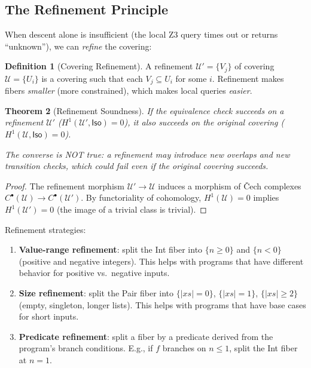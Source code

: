 \documentclass[11pt,a4paper]{report}
\theoremstyle{definition}
\newtheorem{definition}{Definition}[chapter]
\theoremstyle{plain}
\newtheorem{theorem}[definition]{Theorem}
\newcommand{\covers}{\mathcal{U}}
\newcommand{\Iso}{\mathsf{Iso}}
\newcommand{\Hone}{H^1}
\begin{document}
\subsection{The Refinement Principle}

When descent alone is insufficient (the local Z3 query times out or
returns ``unknown''), we can \emph{refine} the covering:

\begin{definition}[Covering Refinement]
A refinement $\covers' = \{V_j\}$ of covering $\covers = \{U_i\}$
is a covering such that each $V_j \subseteq U_i$ for some $i$.
Refinement makes fibers \emph{smaller} (more constrained), which
makes local queries \emph{easier}.
\end{definition}

\begin{theorem}[Refinement Soundness]
\label{thm:refinement}
If the equivalence check succeeds on a refinement $\covers'$
($\Hone(\covers', \Iso) = 0$), it also succeeds on the original
covering ($\Hone(\covers, \Iso) = 0$).

The converse is NOT true: a refinement may introduce new overlaps
and new transition checks, which could fail even if the original
covering succeeds.
\end{theorem}

\begin{proof}
The refinement morphism $\covers' \to \covers$ induces a morphism
of \v{C}ech complexes $C^\bullet(\covers) \to C^\bullet(\covers')$.
By functoriality of cohomology, $\Hone(\covers) = 0$ implies
$\Hone(\covers') = 0$ (the image of a trivial class is trivial).
\end{proof}

Refinement strategies:
\begin{enumerate}
  \item \textbf{Value-range refinement}: split the Int fiber into
    $\{n \geq 0\}$ and $\{n < 0\}$ (positive and negative integers).
    This helps with programs that have different behavior for positive
    vs.\ negative inputs.
  \item \textbf{Size refinement}: split the Pair fiber into
    $\{|xs| = 0\}$, $\{|xs| = 1\}$, $\{|xs| \geq 2\}$ (empty,
    singleton, longer lists).  This helps with programs that have
    base cases for short inputs.
  \item \textbf{Predicate refinement}: split a fiber by a predicate
    derived from the program's branch conditions.  E.g., if $f$
    branches on $n \leq 1$, split the Int fiber at $n = 1$.
\end{enumerate}
\end{document}
